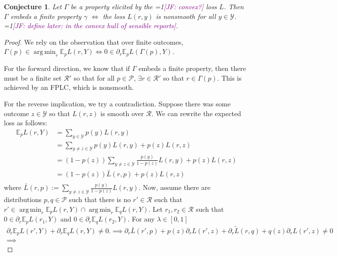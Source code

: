 \documentclass[12pt]{article}
\newcommand{\Comments}{1}
\newcommand{\mynote}[2]{\ifnum\Comments=1\textcolor{#1}{#2}\fi}
\newcommand{\jessie}[1]{\mynote{purple}{[JF: #1]}}
\newcommand{\E}{\mathbb{E}}
\renewcommand{\P}{\mathcal{P}}
\newcommand{\R}{\mathcal{R}}
\newcommand{\Y}{\mathcal{Y}}
\DeclareMathOperator*{\argmin}{arg\,min}
\newtheorem{conjecture}{Conjecture}
\begin{document}
\newpage
\begin{conjecture}\label{conj:embeds-finite-iff-nonsmooth}
	Let $\Gamma$ be a property elicited by the \jessie{convex?} loss $L$.
	Then $\Gamma$ embeds a finite property $\gamma$ $\iff$ the loss $L(r,y)$ is nonsmooth for all $y \in \Y$.  \jessie{define later: in the convex hull of sensible reports}.
\end{conjecture}
\begin{proof}
	We rely on the observation that over finite outcomes, $\Gamma(p) \in \argmin_r \E_p L(r,Y) \iff 0 \in \partial_r \E_p L(\Gamma(p), Y)$.
	
	For the forward direction, we know that if $\Gamma$ embeds a finite property, then there must be a finite set $\R'$ so that for all $p \in \P$, $\exists r \in \R'$ so that $r \in \Gamma(p)$.
	This is achieved by an FPLC, which is nonsmooth.
	
	For the reverse implication, we try a contradiction.
	Suppose there was some outcome $z \in \Y$ so that $L(r,z)$ is smooth over $\R$.
	We can rewrite the expected loss as follows:
	\begin{align*}
		\E_p L(r,Y) &= \sum_{y \in \Y} p(y) L(r, y) \\
		&= \sum_{y\neq z \in \Y} p(y) L(r, y) + p(z) L(r,z) \\
		&= (1-p(z))\sum_{y\neq z \in \Y} \frac{p(y)}{1-p(z)} L(r, y) + p(z) L(r,z) \\
		&= (1-p(z))\bar L(r,p) + p(z) L(r,z) \\
	\end{align*}
	where $\bar L(r,p) := \sum_{y\neq z \in \Y} \frac{p(y)}{1-p(z)} L(r,y)$.
	Now, assume there are distributions $p, q \in \P$ such that there is no $r' \in \R$ such that $r' \in \argmin_r \E_pL(r,Y) \cap \argmin_r \E_q L(r,Y)$.
	Let $r_1, r_2 \in \R$ such that $0 \in \partial_r \E_p L(r_1, Y)$ and $0 \in \partial_r \E_q L(r_2, Y)$. 
	For any $\lambda \in [0,1]$
	\begin{align*}
		\partial_r \E_p L(r', Y) + \partial_r \E_q L(r, Y) \neq 0.		
		\implies \partial_r \bar L(r', p) + p(z) \partial_r L(r',z)  + \partial_r \tilde L(r, q) + q(z) \partial_r L(r',z) \neq 0\\
		\implies 
	\end{align*}
\end{proof}
\end{document}
